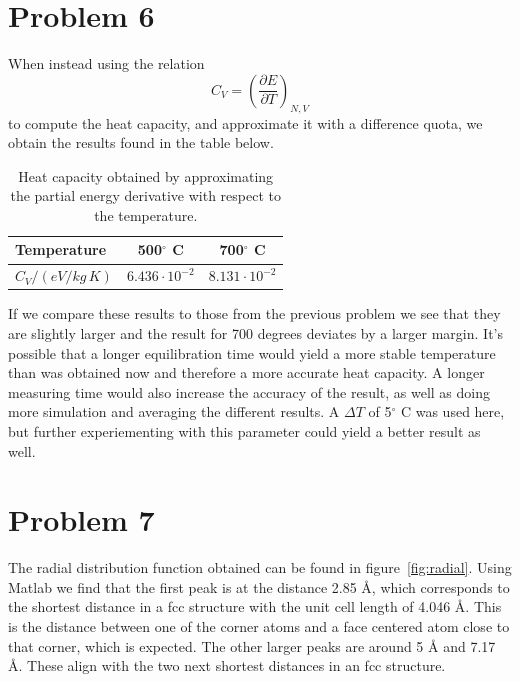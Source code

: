 \section*{Problem 6}

When instead using the relation
\begin{equation}
	C_V = \left( \frac{\partial E}{\partial T} \right)_{N,V}
\end{equation}
to compute the heat capacity, and approximate it with a difference quota, we obtain the results found in the table below.

\begin{table}[h!]
	\centering	
	\caption{Heat capacity obtained by approximating the partial energy derivative with respect to the temperature.}
	\begin{tabular}{l|cc}
		\hline \textbf{Temperature} & \textbf{500$^\circ$ C} & \textbf{700$^\circ$ C} \\ \hline
		$C_V / (\unit{eV/kg\,K})$ & $6.436 \cdot 10^{-2}$ & $8.131 \cdot 10^{-2}$ \\ \hline
	\end{tabular}
	\label{tab:prob6}
\end{table}

If we compare these results to those from the previous problem we see that they are slightly larger and the result for 700 degrees deviates by a larger margin. It's possible that a longer equilibration time would yield a more stable temperature than was obtained now and therefore a more accurate heat capacity. A longer measuring time would also increase the accuracy of the result, as well as doing more simulation and averaging the different results. A $\Delta T$ of 5$^\circ$ C was used here, but further experiementing with this parameter could yield a better result as well.

\section*{Problem 7}

The radial distribution function obtained can be found in figure~\ref{fig:radial}. Using Matlab we find that the first peak is at the distance 2.85 \r{A}, which corresponds to the shortest distance in a fcc structure with the unit cell length of 4.046 \r{A}. This is the distance between one of the corner atoms and a face centered atom close to that corner, which is expected. The other larger peaks are around 5 \r{A} and 7.17 \r{A}. These align with the two next shortest distances in an fcc structure.

